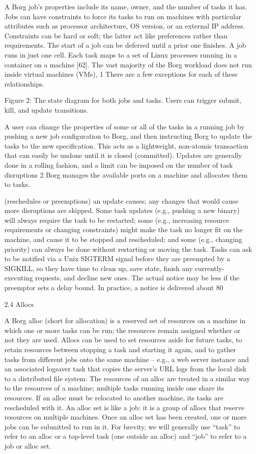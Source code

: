 A Borg job’s properties include its name, owner, and the number of tasks it has.
Jobs can have constraints to force its tasks to run on machines with particular
attributes such as processor architecture, OS version, or an external IP
address.
Constraints can be hard or soft; the latter act like preferences rather than
requirements.
The start of a job can be deferred until a prior one finishes.
A job runs in just one cell.
Each task maps to a set of Linux processes running in a container on a machine
[62].
The vast majority of the Borg workload does not run inside virtual machines
(VMs), 1 There are a few exceptions for each of these relationships.

Figure 2: The state diagram for both jobs and tasks. Users can
trigger submit, kill, and update transitions.

A user can change the properties of some or all of the
tasks in a running job by pushing a new job configuration
to Borg, and then instructing Borg to update the tasks to
the new specification. This acts as a lightweight, non-atomic
transaction that can easily be undone until it is closed (committed). Updates are generally done in a rolling fashion, and
a limit can be imposed on the number of task disruptions
2 Borg manages the available ports on a machine and allocates them to tasks.


(reschedules or preemptions) an update causes; any changes
that would cause more disruptions are skipped.
Some task updates (e.g., pushing a new binary) will always require the task to be restarted; some (e.g., increasing
resource requirements or changing constraints) might make
the task no longer fit on the machine, and cause it to be
stopped and rescheduled; and some (e.g., changing priority)
can always be done without restarting or moving the task.
Tasks can ask to be notified via a Unix SIGTERM signal before they are preempted by a SIGKILL, so they have
time to clean up, save state, finish any currently-executing
requests, and decline new ones. The actual notice may be
less if the preemptor sets a delay bound. In practice, a notice
is delivered about 80%

2.4 Allocs

A Borg alloc (short for allocation) is a reserved set of resources on a machine in which one or more tasks can be
run; the resources remain assigned whether or not they are
used. Allocs can be used to set resources aside for future
tasks, to retain resources between stopping a task and starting it again, and to gather tasks from different jobs onto the
same machine – e.g., a web server instance and an associated logsaver task that copies the server’s URL logs from
the local disk to a distributed file system. The resources of
an alloc are treated in a similar way to the resources of a machine; multiple tasks running inside one share its resources.
If an alloc must be relocated to another machine, its tasks are
rescheduled with it.
An alloc set is like a job: it is a group of allocs that reserve
resources on multiple machines. Once an alloc set has been
created, one or more jobs can be submitted to run in it. For
brevity, we will generally use “task” to refer to an alloc or a
top-level task (one outside an alloc) and “job” to refer to a
job or alloc set.

